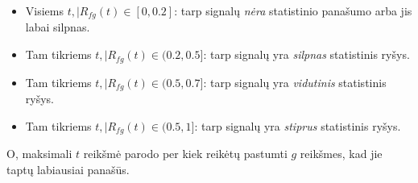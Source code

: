 \begin{itemize}
    \item Visiems \(t, |R_{fg}(t) \in [0, 0.2]\): tarp signalų \textit{nėra} statistinio panašumo arba jis labai silpnas.
    \item Tam tikriems \(t, |R_{fg}(t) \in (0.2, 0.5]\): tarp signalų yra \textit{silpnas} statistinis ryšys.
    \item Tam tikriems \(t, |R_{fg}(t) \in (0.5, 0.7]\): tarp signalų yra \textit{vidutinis} statistinis ryšys.
    \item Tam tikriems \(t, |R_{fg}(t) \in (0.5, 1]\): tarp signalų yra \textit{stiprus} statistinis ryšys.
\end{itemize}

O, maksimali \(t\) reikšmė parodo per kiek reikėtų pastumti \(g\) reikšmes, kad jie taptų labiausiai panašūs.
